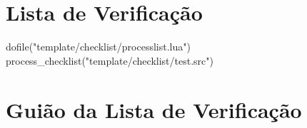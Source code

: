 %

\tableofcontents
\newpage

\section{Lista de Verificação}\label{sec:lista-de-verificacao}
\begin{small}
\begin{luacode}
dofile("template/checklist/processlist.lua")
process_checklist("template/checklist/test.src")
\end{luacode}
\end{small}
\newpage

\section{Guião da Lista de Verificação}\label{sec:guiao-da-lista-de-verificacao}
\newpage

\printbibliography[title={Referências}]